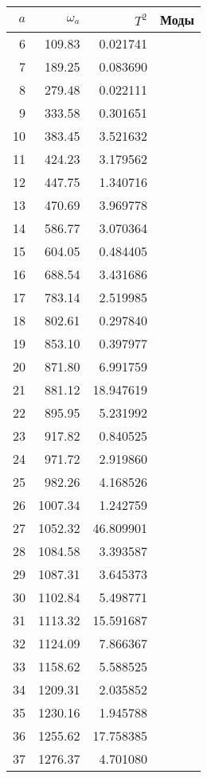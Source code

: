 \tiny
\begin{tabular}{r|rr|l}
  \toprule
  $a$ &  $\omega_a$ & $T^2$ & Моды 
  \\ 
  \midrule
  6  &  109.83  &  0.021741  & \\
  7  &  189.25  &  0.083690  & \\
  8  &  279.48  &  0.022111  & \\
  9  &  333.58  &  0.301651  & \\
  10 &  383.45  &  3.521632  & \\
  11 &  424.23  &  3.179562  & \\
  12 &  447.75  &  1.340716  & \\
  13 &  470.69  &  3.969778  & \\
  14 &  586.77  &  3.070364  & \\
  15 &  604.05  &  0.484405  & \\
  16 &  688.54  &  3.431686  & \\
  17 &  783.14  &  2.519985  & \\
  18 &  802.61  &  0.297840  & \\
  19 &      853.10  &  0.397977  & \\
  20 &      871.80  &  6.991759  & \\
  21 &      881.12  & 18.947619  & \\
  22 &      895.95  &  5.231992  & \\
  23 &      917.82  &  0.840525  & \\
  24 &      971.72  &  2.919860  & \\
  25 &      982.26  &  4.168526  & \\
  26 &     1007.34  &  1.242759  & \\
  27 &     1052.32  & 46.809901  & \\
  28 &     1084.58  &  3.393587  & \\
  29 &     1087.31  &  3.645373  & \\
  30 &     1102.84  &  5.498771  & \\
  31 &     1113.32  & 15.591687  & \\
  32 &     1124.09  &  7.866367  & \\
  33 &     1158.62  &  5.588525  & \\
  34 &     1209.31  &  2.035852  & \\
  35 &     1230.16  &  1.945788  & \\
  36 &     1255.62  & 17.758385  & \\
  37 &     1276.37  &  4.701080  & \\

\end{tabular}
